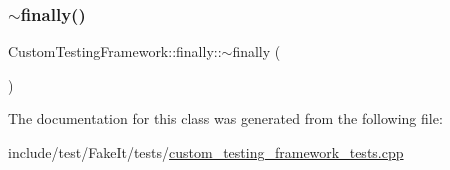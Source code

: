 \subsubsection{\texorpdfstring{$\sim$finally()}{~finally()}}
{\footnotesize\ttfamily Custom\+Testing\+Framework\+::finally\+::$\sim$finally (\begin{DoxyParamCaption}{ }\end{DoxyParamCaption})\hspace{0.3cm}{\ttfamily [inline]}}



The documentation for this class was generated from the following file\+:\begin{DoxyCompactItemize}
\item 
include/test/\+Fake\+It/tests/\mbox{\hyperlink{custom__testing__framework__tests_8cpp}{custom\+\_\+testing\+\_\+framework\+\_\+tests.\+cpp}}\end{DoxyCompactItemize}
